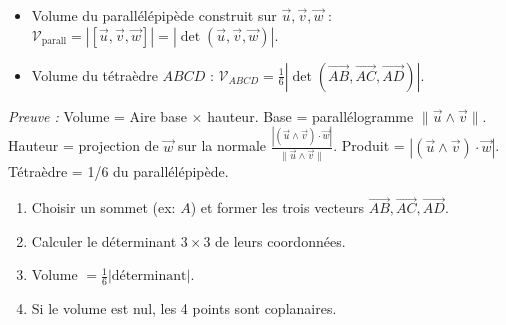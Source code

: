 \documentclass[11pt]{article}
\begin{document}
\begin{propriete}[Volumes]
\begin{itemize}
  \item Volume du parallélépipède construit sur $\vec{u},\vec{v},\vec{w}$ : $\mathcal{V}_{\text{parall}} = |[\vec{u},\vec{v},\vec{w}]| = |\det(\vec{u},\vec{v},\vec{w})|$.
  \item Volume du tétraèdre $ABCD$ : $\mathcal{V}_{ABCD} = \frac{1}{6}|\det(\overrightarrow{AB},\overrightarrow{AC},\overrightarrow{AD})|$.
\end{itemize}
\emph{Preuve :} Volume = Aire base $\times$ hauteur. Base = parallélogramme $\|\vec{u}\wedge\vec{v}\|$. Hauteur = projection de $\vec{w}$ sur la normale $\frac{|(\vec{u}\wedge\vec{v})\cdot\vec{w}|}{\|\vec{u}\wedge\vec{v}\|}$. Produit = $|(\vec{u}\wedge\vec{v})\cdot\vec{w}|$. Tétraèdre = 1/6 du parallélépipède.
\end{propriete}

\begin{methode}
\begin{enumerate}
  \item Choisir un sommet (ex: $A$) et former les trois vecteurs $\overrightarrow{AB},\overrightarrow{AC},\overrightarrow{AD}$.
  \item Calculer le déterminant $3\times 3$ de leurs coordonnées.
  \item Volume $= \frac{1}{6}|\text{déterminant}|$.
  \item Si le volume est nul, les 4 points sont coplanaires.
\end{enumerate}
\end{methode}
\end{document}

